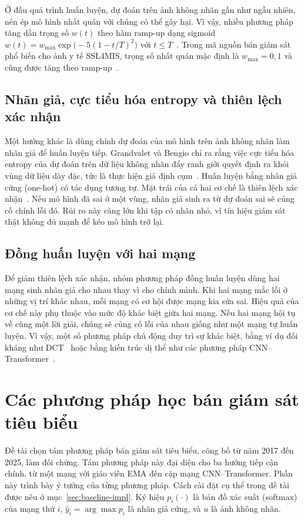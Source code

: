 Ở đầu quá trình huấn luyện, dự đoán trên ảnh không nhãn gần như ngẫu nhiên, nên ép mô hình nhất quán với chúng có thể gây hại. Vì vậy, nhiều phương pháp tăng dần trọng số $w(t)$ theo hàm ramp-up dạng sigmoid $w(t)=w_{\max}\exp\!\big(-5(1-t/T)^2\big)$ với $t\le T$~\cite{laine2017temporal}. Trong mã nguồn bán giám sát phổ biến cho ảnh y tế SSL4MIS, trọng số nhất quán mặc định là $w_{\max}=0{,}1$ và cũng được tăng theo ramp-up~\cite{luo2020ssl4mis}.

\subsection{Nhãn giả, cực tiểu hóa entropy và thiên lệch xác nhận}

Một hướng khác là dùng chính dự đoán của mô hình trên ảnh không nhãn làm nhãn giả để huấn luyện tiếp. Grandvalet và Bengio chỉ ra rằng việc cực tiểu hóa entropy của dự đoán trên dữ liệu không nhãn đẩy ranh giới quyết định ra khỏi vùng dữ liệu dày đặc, tức là thực hiện giả định cụm~\cite{grandvalet2005entropy}. Huấn luyện bằng nhãn giả cứng (one-hot) có tác dụng tương tự. Mặt trái của cả hai cơ chế là thiên lệch xác nhận~\cite{arazo2020pseudo}. Nếu mô hình đã sai ở một vùng, nhãn giả sinh ra từ dự đoán sai sẽ củng cố chính lỗi đó. Rủi ro này càng lớn khi tập có nhãn nhỏ, vì tín hiệu giám sát thật không đủ mạnh để kéo mô hình trở lại.

\subsection{Đồng huấn luyện với hai mạng}

Để giảm thiên lệch xác nhận, nhóm phương pháp đồng huấn luyện dùng hai mạng sinh nhãn giả cho nhau thay vì cho chính mình. Khi hai mạng mắc lỗi ở những vị trí khác nhau, mỗi mạng có cơ hội được mạng kia sửa sai. Hiệu quả của cơ chế này phụ thuộc vào mức độ khác biệt giữa hai mạng. Nếu hai mạng hội tụ về cùng một lời giải, chúng sẽ củng cố lỗi của nhau giống như một mạng tự huấn luyện. Vì vậy, một số phương pháp chủ động duy trì sự khác biệt, bằng ví dụ đối kháng như DCT~\cite{qiao2018dct} hoặc bằng kiến trúc dị thể như các phương pháp CNN--Transformer~\cite{luo2022ctct}.

\section{Các phương pháp học bán giám sát tiêu biểu}
\label{sec:baselines}

Đề tài chọn tám phương pháp bán giám sát tiêu biểu, công bố từ năm 2017 đến 2025, làm đối chứng. Tám phương pháp này đại diện cho ba hướng tiếp cận chính, từ một mạng với giáo viên EMA đến cặp mạng CNN--Transformer. Phần này trình bày ý tưởng của từng phương pháp. Cách cài đặt cụ thể trong đề tài được nêu ở mục~\ref{sec:baseline-impl}. Ký hiệu $p_i(\cdot)$ là bản đồ xác suất (softmax) của mạng thứ $i$, $\hat y_i=\arg\max p_i$ là nhãn giả cứng, và $u$ là ảnh không nhãn.

